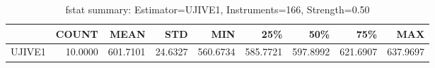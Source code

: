 \begin{table}[ht]
\centering
\caption{fstat summary: Estimator=UJIVE1, Instruments=166, Strength=0.50}
\begin{tabular}{lrrrrrrrr}
\toprule
 & COUNT & MEAN & STD & MIN & 25\% & 50\% & 75\% & MAX \\
\midrule
UJIVE1 & 10.0000 & 601.7101 & 24.6327 & 560.6734 & 585.7721 & 597.8992 & 621.6907 & 637.9697 \\
\bottomrule
\end{tabular}
\end{table}
